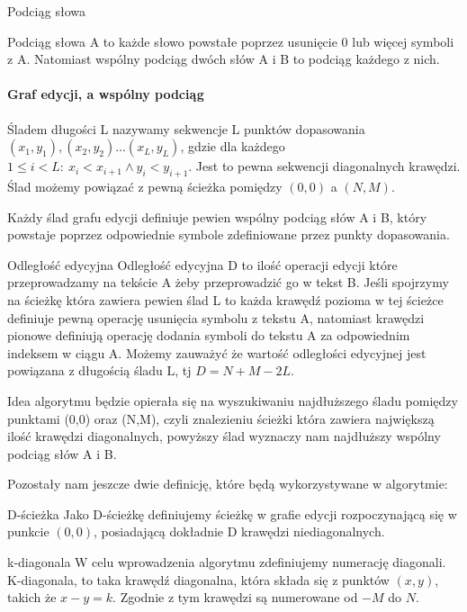 \begin{definition}{}{Podciąg słowa}

Podciąg słowa A to każde słowo powstałe poprzez usunięcie 0 lub więcej symboli z A. Natomiast wspólny podciąg dwóch słów A i B to podciąg każdego z nich. 
\end{definition}

\paragraph{Graf edycji, a wspólny podciąg}

\begin{definition}{}{}
Śladem długości L nazywamy sekwencje L punktów dopasowania $(x_{1},y_{1}),(x_{2},y_{2})\dots(x_{L}, y_{L})$, gdzie dla każdego $1 \leq i < L:\:x_{i}<x_{i+1} \wedge y_{i}<y_{i+1}$. Jest to pewna sekwencji diagonalnych krawędzi. Ślad możemy powiązać z pewną ścieżka pomiędzy $(0,0)$ a $(N, M)$.
\end{definition}

Każdy ślad grafu edycji definiuje pewien wspólny podciąg słów A i B, który powstaje poprzez odpowiednie symbole zdefiniowane przez punkty dopasowania.

\begin{definition}{}{Odległość edycyjna}
Odległość edycyjna D to ilość operacji edycji które przeprowadzamy na tekście A żeby przeprowadzić go w tekst B. Jeśli spojrzymy na ścieżkę która zawiera pewien ślad L to każda krawędź pozioma w tej ścieżce definiuje pewną operację usunięcia symbolu z tekstu A, natomiast krawędzi pionowe definiują operację dodania symboli do tekstu A za odpowiednim indeksem w ciągu A. Możemy zauważyć że wartość odległości edycyjnej jest powiązana z długością śladu L, tj $D = N + M - 2L$.
\end{definition}

Idea algorytmu będzie opierała się na wyszukiwaniu najdłuższego śladu pomiędzy punktami (0,0) oraz (N,M), czyli znalezieniu ścieżki która zawiera największą ilość krawędzi diagonalnych, powyższy ślad wyznaczy nam najdłuższy wspólny podciąg słów A i B.

Pozostały nam jeszcze dwie definicję, które będą wykorzystywane w algorytmie:
\begin{definition}{}{D-ścieżka}
Jako D-ścieżkę definiujemy ścieżkę w grafie edycji rozpoczynającą się w punkcie $(0,0)$, posiadającą dokładnie D krawędzi niediagonalnych.
\end{definition}

\begin{definition}{}{k-diagonala}
W celu wprowadzenia algorytmu zdefiniujemy numerację diagonali. K-diagonala, to taka krawędź diagonalna, która składa się z punktów $(x,y)$, takich że $x - y = k$. Zgodnie z tym krawędzi są numerowane od $-M$ do $N$.
\end{definition}

